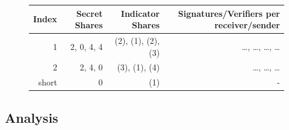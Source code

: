 \documentclass{dalcsthesis}
\begin{document}
\begin{figure}
\begin{itemize}
      \begin{tabular}{|r|r|r|r|}
      \hline
        Index & Secret Shares & Indicator Shares & Signatures/Verifiers per receiver/sender \\
      \hline
        1 & 2, 0, 4, 4 & (2), (1), (2), (3) & \ldots, \ldots, \ldots, \ldots\\
      \hline
        2 & 2, 4, 0 & (3), (1), (4) & \ldots, \ldots, \ldots\\
      \hline
        short & 0 & (1) & -\\
      \hline
      \end{tabular}
  \end{itemize}
\end{figure}

\subsection{Analysis}
\end{document}
